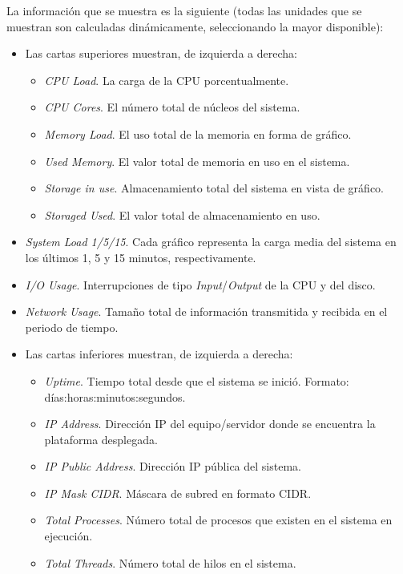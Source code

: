 La información que se muestra es la siguiente (todas las unidades que se muestran son calculadas dinámicamente, seleccionando la mayor disponible):
\begin{itemize}
\item Las cartas superiores muestran, de izquierda a derecha:
\begin{itemize}
	\item \textit{CPU Load}. La carga de la CPU porcentualmente.
	\item \textit{CPU Cores}. El número total de núcleos del sistema.
	\item \textit{Memory Load}. El uso total de la memoria en forma de gráfico.
	\item \textit{Used Memory}. El valor total de memoria en uso en el sistema.
	\item \textit{Storage in use}. Almacenamiento total del sistema en vista de gráfico.
	\item \textit{Storaged Used}. El valor total de almacenamiento en uso.
\end{itemize}
\item \textit{System Load 1/5/15}. Cada gráfico representa la carga media del sistema en los últimos 1, 5 y 15 minutos, respectivamente.
\item \textit{I/O Usage}. Interrupciones de tipo \textit{Input}/\textit{Output} de la CPU y del disco.
\item \textit{Network Usage}. Tamaño total de información transmitida y recibida en el periodo de tiempo.
\item Las cartas inferiores muestran, de izquierda a derecha:
\begin{itemize}
	\item \textit{Uptime}. Tiempo total desde que el sistema se inició. Formato: días:horas:minutos:segundos.
	\item \textit{IP Address}. Dirección IP del equipo/servidor donde se encuentra la plataforma desplegada.
	\item \textit{IP Public Address}. Dirección IP pública del sistema.
	\item \textit{IP Mask CIDR}. Máscara de subred en formato CIDR.
	\item \textit{Total Processes}. Número total de procesos que existen en el sistema en ejecución.
	\item \textit{Total Threads}. Número total de hilos en el sistema.
\end{itemize}
\end{itemize}

